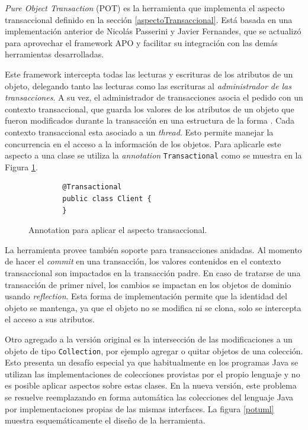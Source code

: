 \emph{Pure Object Transaction} (POT) es la herramienta que implementa el
aspecto transaccional definido en la sección \ref{aspectoTransaccional}.
Está basada en una implementación anterior de Nicolás Passerini y Javier
Fernandes, que se actualizó para aprovechar el framework APO y facilitar su
integración con las demás herramientas desarrolladas.

\medskip
 
Este framework intercepta todas las lecturas y escrituras de los atributos de
un objeto, delegando tanto las lecturas como las escrituras al
\emph{administrador de las transacciones}.
A su vez, el administrador de transacciones asocia el pedido con un contexto
transaccional, que guarda los valores de los atributos de un objeto que fueron
modificados durante la transacción en una estructura de la forma
.
Cada contexto transaccional esta asociado a un \emph{thread}. Esto
permite manejar la concurrencia en el acceso a la información de los objetos.
Para aplicarle este aspecto a una clase se utiliza la \emph{annotation} \lstinline|Transactional| como
se muestra en la Figura \ref{annoTransactional}.

\begin{figure}[!hp]
	\begin{lstlisting} 
		@Transactional
		public class Client {
		}
	\end{lstlisting}
	\caption{Annotation para aplicar el aspecto transaccional.}
	\label{annoTransactional}
\end{figure}
	
\medskip
 
La herramienta provee también soporte para transacciones anidadas.
Al momento de hacer el \emph{commit} en una transacción, los valores
contenidos en el contexto transaccional son impactados en la transacción
padre.
En caso de tratarse de una transacción de primer nivel, los cambios se impactan
en los objetos de dominio usando \emph{reflection}.
Esta forma de implementación permite que la identidad del objeto se
mantenga, ya que el objeto no se modifica ni se clona, solo se intercepta el
acceso a sus atributos.

Otro agregado a la versión original es la intersección de las modificaciones 
a un objeto de tipo \lstinline|Collection|, por ejemplo agregar o quitar
objetos de una colección.
Esto presenta un desafío especial ya que habitualmente en los programas Java
se utilizan las implementaciones de colecciones provistas por el propio
lenguaje y no es posible aplicar aspectos sobre estas clases. 
En la nueva versión, este problema se resuelve reemplazando en forma
automática las colecciones del lenguaje Java por
implementaciones propias de las mismas interfaces.
La figura \ref{potuml} muestra esquemáticamente el diseño de la herramienta.

